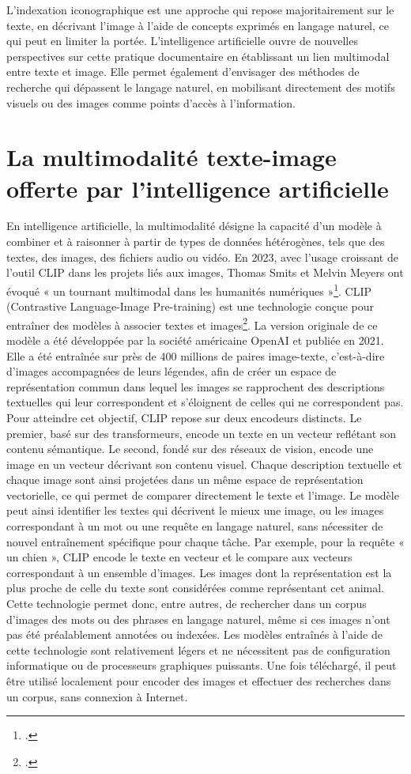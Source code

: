L’indexation iconographique est une approche qui repose majoritairement sur le texte, en décrivant l’image à l’aide de concepts exprimés en langage naturel, ce qui peut en limiter la portée. L’intelligence artificielle ouvre de nouvelles perspectives sur cette pratique documentaire en établissant un lien multimodal entre texte et image. Elle permet également d’envisager des méthodes de recherche qui dépassent le langage naturel, en mobilisant directement des motifs visuels ou des images comme points d’accès à l’information.


\section[Multimodalité]{La multimodalité texte-image offerte par l'intelligence artificielle}

En intelligence artificielle, la multimodalité désigne la capacité d’un modèle à combiner et à raisonner à partir de types de données hétérogènes, tels que des textes, des images, des fichiers audio ou vidéo. En 2023, avec l’usage croissant de l’outil CLIP dans les projets liés aux images, Thomas Smits et Melvin Meyers ont évoqué « un tournant multimodal dans les humanités numériques »\footcite{smitsMultimodalTurnDigital2023}. CLIP (Contrastive Language-Image Pre-training) est une technologie conçue pour entraîner des modèles à associer textes et images\footcite{radfordLearningTransferableVisual2021}. La version originale de ce modèle a été développée par la société américaine OpenAI et publiée en 2021. Elle a été entraînée sur près de 400 millions de paires image-texte, c’est-à-dire d’images accompagnées de leurs légendes, afin de créer un espace de représentation commun dans lequel les images se rapprochent des descriptions textuelles qui leur correspondent et s’éloignent de celles qui ne correspondent pas. Pour atteindre cet objectif, CLIP repose sur deux encodeurs distincts. Le premier, basé sur des transformeurs, encode un texte en un vecteur reflétant son contenu sémantique. Le second, fondé sur des réseaux de vision, encode une image en un vecteur décrivant son contenu visuel. Chaque description textuelle et chaque image sont ainsi projetées dans un même espace de représentation vectorielle, ce qui permet de comparer directement le texte et l’image. Le modèle peut ainsi identifier les textes qui décrivent le mieux une image, ou les images correspondant à un mot ou une requête en langage naturel, sans nécessiter de nouvel entraînement spécifique pour chaque tâche. Par exemple, pour la requête « un chien », CLIP encode le texte en vecteur et le compare aux vecteurs correspondant à un ensemble d’images. Les images dont la représentation est la plus proche de celle du texte sont considérées comme représentant cet animal. Cette technologie permet donc, entre autres, de rechercher dans un corpus d’images des mots ou des phrases en langage naturel, même si ces images n’ont pas été préalablement annotées ou indexées. Les modèles entraînés à l’aide de cette technologie sont relativement légers et ne nécessitent pas de configuration informatique ou de processeurs graphiques puissants. Une fois téléchargé, il peut être utilisé localement pour encoder des images et effectuer des recherches dans un corpus, sans connexion à Internet.

